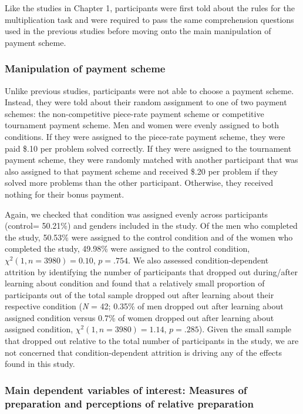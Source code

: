 \documentclass[a4paper, nobind]{templates/ociamthesis}
\begin{document}
Like the studies in Chapter 1, participants were first told about the rules for the multiplication task and were required to pass the same comprehension questions used in the previous studies before moving onto the main manipulation of payment scheme.

\hypertarget{manipulation-of-payment-scheme}{%
\subsubsection{Manipulation of payment scheme}\label{manipulation-of-payment-scheme}}

Unlike previous studies, participants were not able to choose a payment scheme. Instead, they were told about their random assignment to one of two payment schemes: the non-competitive piece-rate payment scheme or competitive tournament payment scheme. Men and women were evenly assigned to both conditions. If they were assigned to the piece-rate payment scheme, they were paid \$.10 per problem solved correctly. If they were assigned to the tournament payment scheme, they were randomly matched with another participant that was also assigned to that payment scheme and received \$.20 per problem if they solved more problems than the other participant. Otherwise, they received nothing for their bonus payment.

Again, we checked that condition was assigned evenly across participants (control= 50.21\%) and genders included in the study. Of the men who completed the study, 50.53\% were assigned to the control condition and of the women who completed the study, 49.98\% were assigned to the control condition, \(\chi^2(1, n = 3980) = 0.10\), \(p = .754\). We also assessed condition-dependent attrition by identifying the number of participants that dropped out during/after learning about condition and found that a relatively small proportion of participants out of the total sample dropped out after learning about their respective condition (\emph{N} = 42; 0.35\% of men dropped out after learning about assigned condition versus 0.7\% of women dropped out after learning about assigned condition, \(\chi^2(1, n = 3980) = 1.14\), \(p = .285\)). Given the small sample that dropped out relative to the total number of participants in the study, we are not concerned that condition-dependent attrition is driving any of the effects found in this study.

\hypertarget{main-dependent-variables-of-interest-measures-of-preparation-and-perceptions-of-relative-preparation}{%
\subsubsection{Main dependent variables of interest: Measures of preparation and perceptions of relative preparation}\label{main-dependent-variables-of-interest-measures-of-preparation-and-perceptions-of-relative-preparation}}
\end{document}
